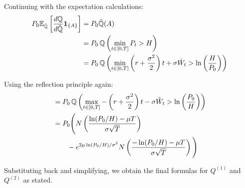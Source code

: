 \documentclass{article}
\begin{document}
Continuing with the expectation calculations:
\begin{align}
P_0\mathbb{E}_{\tilde{\mathbb{Q}}}\left[\frac{d\mathbb{Q}}{d\tilde{\mathbb{Q}}}\mathbf{1}_{\{A\}}\right] &= P_0\tilde{\mathbb{Q}}(A)\\
&= P_0\,\mathbb{Q}\left(\min_{t \in [0,T]} P_t > H\right) \notag\\
&= P_0\,\mathbb{Q}\left(\min_{t \in [0,T]} \left(r + \frac{\sigma^2}{2}\right)t + \sigma\hat{W}_t > \ln\left(\frac{H}{P_0}\right)\right)
\end{align}

Using the reflection principle again:
\begin{align}
&= P_0\,\mathbb{Q}\left(\max_{t \in [0,T]} -\left(r + \frac{\sigma^2}{2}\right)t - \sigma\hat{W}_t > \ln\left(\frac{P_0}{H}\right)\right)\\
&= P_0\Bigg(N\left(\frac{\ln(P_0/H) - \mu T}{\sigma\sqrt{T}}\right) \notag\\
&\qquad - e^{2\mu\ln(P_0/H)/\sigma^2} N\left(\frac{-\ln(P_0/H) - \mu T}{\sigma\sqrt{T}}\right)\Bigg)
\end{align}

Substituting back and simplifying, we obtain the final formulas for $Q^{(1)}$ and $Q^{(2)}$ as stated.
\end{document}
